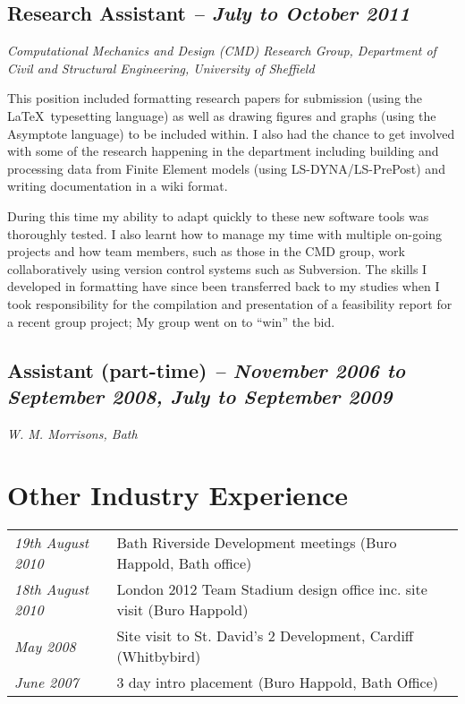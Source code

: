 \documentclass[oneside,a4paper]{article}
\begin{document}
\subsection*{Research Assistant {\it -- July to October 2011}}
{\it Computational Mechanics and Design (CMD) Research Group, Department of Civil and Structural Engineering, University of Sheffield}

This position included formatting research papers for submission (using the \LaTeX~typesetting language) as well as drawing figures and graphs (using the Asymptote language) to be included within. I also had the chance to get involved with some of the research happening in the department including building and processing data from Finite Element models (using LS-DYNA/LS-PrePost) and writing documentation in a wiki format.

During this time my ability to adapt quickly to these new software tools was thoroughly tested. I also learnt how to manage my time with multiple on-going projects and how team members, such as those in the CMD group, work collaboratively using version control systems such as Subversion. The skills I developed in formatting have since been transferred back to my studies when I took responsibility for the compilation and presentation of a feasibility report for a recent group project; My group went on to ``win'' the bid.

\subsection*{Assistant (part-time) {\it -- November 2006 to September 2008, July to September 2009}}
{\it W. M. Morrisons, Bath}

\section*{Other Industry Experience} %

\hspace{-6pt}\begin{tabular}{>{\it}ll}
19th August 2010 & Bath Riverside Development meetings (Buro Happold, Bath office) \\
18th August 2010	 & London 2012 Team Stadium design office inc. site visit (Buro Happold) \\
May 2008	 & Site visit to St. David's 2 Development, Cardiff (Whitbybird) \\
June 2007 & 3 day intro placement (Buro Happold, Bath Office)
\end{tabular}
\end{document}
